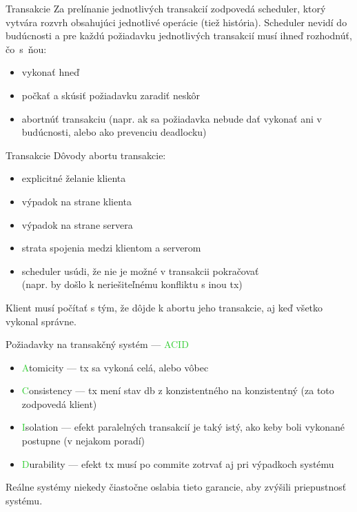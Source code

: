 \documentclass[12pt]{beamer}
\def\blue#1{\textcolor{Cerulean}{#1}}
\def\green#1{\textcolor{LimeGreen}{#1}}
\begin{document}
\begin{frame}[fragile]{Transakcie}
Za prelínanie jednotlivých transakcií zodpovedá \blue{scheduler},
ktorý vytvára \alert{rozvrh} obsahujúci jednotlivé operácie (tiež \alert{história}).
Scheduler nevidí do budúcnosti a pre každú požiadavku jednotlivých transakcií
musí ihneď rozhodnúť, čo~s~ňou:
\begin{itemize}
\item vykonať hneď
\item počkať a skúsiť požiadavku zaradiť neskôr
\item abortnúť transakciu (napr. ak sa požiadavka nebude dať vykonať ani v budúcnosti, alebo ako prevenciu deadlocku)
\end{itemize}
\end{frame}


\begin{frame}[fragile]{Transakcie}
Dôvody abortu transakcie:
\begin{itemize}
\item explicitné želanie klienta
\item výpadok na strane klienta
\item výpadok na strane servera
\item strata spojenia medzi klientom a serverom
\item scheduler usúdi, že nie je možné v transakcii pokračovať\\
    (napr. by došlo k neriešiteľnému konfliktu s inou tx)
\end{itemize}
Klient musí počítať s tým, že dôjde k abortu jeho transakcie, aj keď všetko vykonal správne.
\end{frame}


\begin{frame}[fragile]{Požiadavky na transakčný systém --- \green{ACID}}
\begin{itemize}
\item \green{A}tomicity --- tx sa vykoná celá, alebo vôbec
\item \green{C}onsistency --- tx mení stav db z konzistentného na konzistentný (za toto zodpovedá klient)
\item \green{I}solation --- efekt paralelných transakcií je taký istý, ako keby boli vykonané postupne (v nejakom poradí)
\item \green{D}urability --- efekt tx musí po commite zotrvať aj pri výpadkoch systému
\end{itemize}
Reálne systémy niekedy čiastočne oslabia tieto garancie, aby zvýšili priepustnosť systému.
\end{frame}
\end{document}
